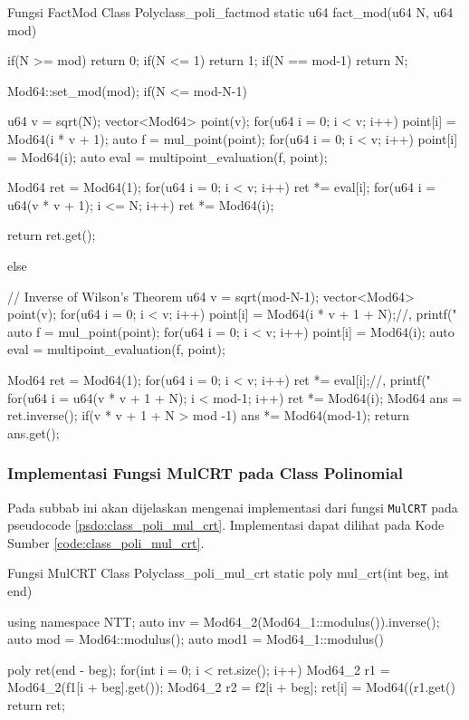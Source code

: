 \begin{code}[firstnumber=1]{Fungsi FactMod Class Poly}{class_poli_factmod}
	static u64 fact_mod(u64 N, u64 mod) {
		if(N >= mod) return 0;
		if(N <= 1) return 1;
		if(N == mod-1) return N;
	
		Mod64::set_mod(mod);
        if(N <= mod-N-1){
            u64 v = sqrt(N);
            vector<Mod64> point(v);
            for(u64 i = 0; i < v; i++) point[i] = Mod64(i * v + 1);
            auto f = mul_point(point);
            for(u64 i = 0; i < v; i++) point[i] = Mod64(i);
            auto eval = multipoint_evaluation(f, point);

            Mod64 ret = Mod64(1);
            for(u64 i = 0; i < v; i++) ret *= eval[i];
            for(u64 i = u64(v * v + 1); i <= N; i++) ret *= Mod64(i);

            return ret.get();
        } else {
            // Inverse of Wilson's Theorem
            u64 v = sqrt(mod-N-1);
            vector<Mod64> point(v);
            for(u64 i = 0; i < v; i++) point[i] = Mod64(i * v + 1 + N);//, printf("%
            auto f = mul_point(point);
            for(u64 i = 0; i < v; i++) point[i] = Mod64(i);
            auto eval = multipoint_evaluation(f, point);

            Mod64 ret = Mod64(1);
            for(u64 i = 0; i < v; i++) ret *= eval[i];//, printf("%
            for(u64 i = u64(v * v + 1 + N); i < mod-1; i++) ret *= Mod64(i);
            Mod64 ans = ret.inverse();
            if(v * v + 1 + N > mod -1) ans *= Mod64(mod-1);
            return ans.get();
        }
		
	}
\end{code}

\subsubsection{Implementasi Fungsi MulCRT pada Class Polinomial}
Pada subbab ini akan dijelaskan mengenai implementasi dari fungsi \texttt{MulCRT} pada pseudocode \ref{psdo:class_poli_mul_crt}. Implementasi dapat dilihat pada Kode Sumber \ref{code:class_poli_mul_crt}.


\begin{code}[firstnumber=1]{Fungsi MulCRT Class Poly}{class_poli_mul_crt}
	static poly mul_crt(int beg, int end){
		using namespace NTT;
		auto inv = Mod64_2(Mod64_1::modulus()).inverse();
		auto mod = Mod64::modulus();
		auto mod1 = Mod64_1::modulus() %

		poly ret(end - beg);
		for(int i = 0; i < ret.size(); i++){
			Mod64_2 r1 = Mod64_2(f1[i + beg].get());
			Mod64_2 r2 = f2[i + beg];			
			ret[i] = Mod64((r1.get() %
		}
		return ret;
	}
\end{code}

